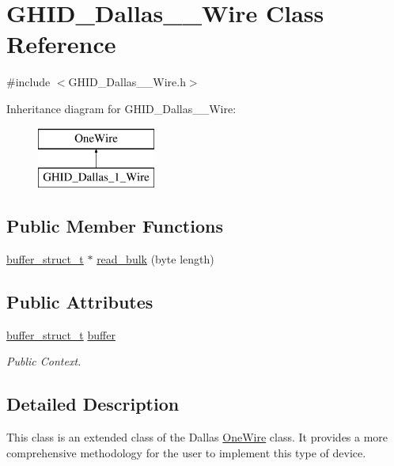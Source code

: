 \hypertarget{class_g_h_i_d___dallas__1___wire}{\section{\-G\-H\-I\-D\-\_\-\-Dallas\-\_\-\_\-\-Wire \-Class \-Reference}
\label{class_g_h_i_d___dallas__1___wire}
}


{\ttfamily \#include $<$\-G\-H\-I\-D\-\_\-\-Dallas\-\_\-\_\-\-Wire.\-h$>$}

\-Inheritance diagram for \-G\-H\-I\-D\-\_\-\-Dallas\-\_\-\_\-\-Wire\-:\begin{figure}[H]
\begin{center}
\leavevmode
\includegraphics[height=2.000000cm]{class_g_h_i_d___dallas__1___wire}
\end{center}
\end{figure}
\subsection*{\-Public \-Member \-Functions}
\begin{DoxyCompactItemize}
\item 
\hyperlink{structbuffer__struct__t}{buffer\-\_\-struct\-\_\-t} $\ast$ \hyperlink{class_g_h_i_d___dallas__1___wire_a10488575da11f8b85134c5692c52f275}{read\-\_\-bulk} (byte length)
\end{DoxyCompactItemize}
\subsection*{\-Public \-Attributes}
\begin{DoxyCompactItemize}
\item 
\hyperlink{structbuffer__struct__t}{buffer\-\_\-struct\-\_\-t} \hyperlink{class_g_h_i_d___dallas__1___wire_a45b4a311e55a4222fcaa7584e3d5defc}{buffer}
\begin{DoxyCompactList}\small\item\em \-Public \-Context. \end{DoxyCompactList}\end{DoxyCompactItemize}


\subsection{\-Detailed \-Description}
\-This class is an extended class of the \-Dallas \hyperlink{class_one_wire}{\-One\-Wire} class. \-It provides a more comprehensive methodology for the user to implement this type of device.

